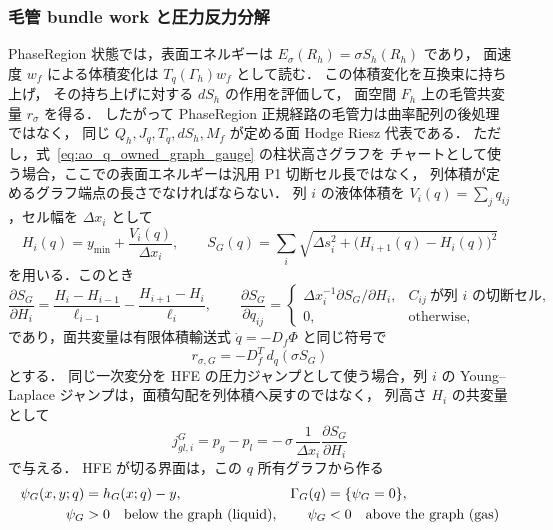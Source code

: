 \subsubsection{毛管 bundle work と圧力反力分解}
\label{sec:ao_bundle_capillarity}

PhaseRegion 状態では，表面エネルギーは
$E_\sigma(R_h)=\sigma S_h(R_h)$ であり，
面速度 $w_f$ による体積変化は $T_q(\Gamma_h)w_f$ として読む．
この体積変化を互換束に持ち上げ，
その持ち上げに対する $dS_h$ の作用を評価して，
面空間 $F_h$ 上の毛管共変量 $r_\sigma$ を得る．
したがって PhaseRegion 正規経路の毛管力は曲率配列の後処理ではなく，
同じ $Q_h,J_q,T_q,dS_h,M_f$ が定める面 Hodge Riesz 代表である．
ただし，式~\eqref{eq:ao_q_owned_graph_gauge} の柱状高さグラフを
チャートとして使う場合，ここでの表面エネルギーは汎用 P1 切断セル長ではなく，
列体積が定めるグラフ端点の長さでなければならない．
列 $i$ の液体体積を $V_i(q)=\sum_j q_{ij}$，セル幅を $\Delta x_i$ として
\begin{equation}
  H_i(q)=y_{\min}+\frac{V_i(q)}{\Delta x_i},
  \qquad
  S_G(q)=\sum_i
  \sqrt{\Delta s_i^2+\bigl(H_{i+1}(q)-H_i(q)\bigr)^2}
  \label{eq:ao_graph_surface_energy}
\end{equation}
を用いる．このとき
\begin{equation}
  \frac{\partial S_G}{\partial H_i}
  =
  \frac{H_i-H_{i-1}}{\ell_{i-1}}
  -
  \frac{H_{i+1}-H_i}{\ell_i},
  \qquad
  \frac{\partial S_G}{\partial q_{ij}}
  =
  \begin{cases}
    \Delta x_i^{-1}\partial S_G/\partial H_i,&
    C_{ij}\ \text{が列 }i\text{ の切断セル},\\
    0,&\text{otherwise},
  \end{cases}
  \label{eq:ao_graph_surface_variation}
\end{equation}
であり，面共変量は有限体積輸送式 $\dot q=-D_f\Phi$ と同じ符号で
\begin{equation}
  r_{\sigma,G}=-D_f^T\,d_q(\sigma S_G)
  \label{eq:ao_graph_capillary_covector}
\end{equation}
とする．
同じ一次変分を HFE の圧力ジャンプとして使う場合，列 $i$ の
Young--Laplace ジャンプは，面積勾配を列体積へ戻すのではなく，
列高さ $H_i$ の共変量として
\begin{equation}
  j_{gl,i}^{G}
  =
  p_g-p_l
  =
  -\,\sigma\,\frac{1}{\Delta x_i}
  \frac{\partial S_G}{\partial H_i}
  \label{eq:ao_graph_hfe_jump}
\end{equation}
で与える．
HFE が切る界面は，この $q$ 所有グラフから作る
\begin{align}
  \psi_G(x,y;q)&=h_G(x;q)-y,
  &
  \Gamma_G(q)&=\{\psi_G=0\}, \notag\\
  \psi_G&>0\quad\text{below the graph (liquid)},
  &
  \psi_G&<0\quad\text{above the graph (gas)}
  \label{eq:ao_graph_hfe_cut}
\end{align}
